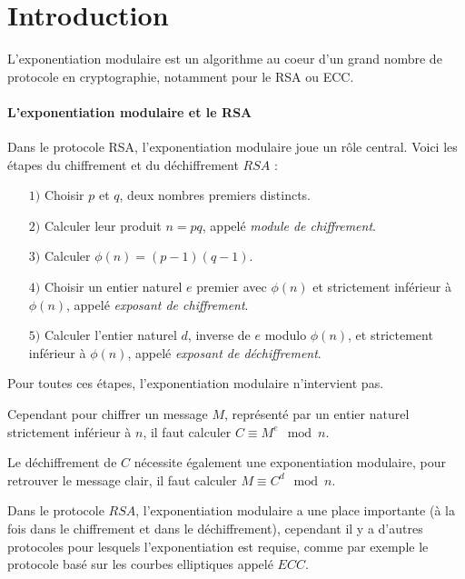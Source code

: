 \documentclass[12pt, a4paper]{memoir}
\begin{document}
\cleardoublepage
\tableofcontents* %
\normalsize

\mainmatter

\chapter{Introduction} 
L'exponentiation modulaire est un algorithme au coeur d'un grand nombre de protocole en cryptographie, notamment pour le RSA ou ECC.

\subsubsection{L'exponentiation modulaire et le RSA}

Dans le protocole RSA, l'exponentiation modulaire joue un rôle central. Voici les étapes du 
chiffrement et du déchiffrement $RSA$ :
\begin{itemize}
 \item [$1)$] Choisir $p$ et $q$, deux nombres premiers distincts.
 \item [$2)$] Calculer leur produit $n = pq$, appelé \emph{module de chiffrement}.
 \item [$3)$] Calculer $\phi(n) = (p-1)(q-1)$.
 \item [$4)$] Choisir un entier naturel $e$ premier avec $\phi(n)$ et strictement inférieur à $\phi(n)$,
 appelé \emph{exposant de chiffrement}.
 \item [$5)$] Calculer l'entier naturel $d$, inverse de $e$ modulo $\phi(n)$, et strictement inférieur à $\phi(n)$,
 appelé \emph{exposant de déchiffrement}.
\end{itemize}

Pour toutes ces étapes, l'exponentiation modulaire n'intervient pas.

Cependant pour chiffrer un message $M$, représenté par un entier naturel strictement inférieur à $n$, il faut 
calculer $C \equiv M^e \mod n$.

Le déchiffrement de $C$ nécessite également une exponentiation modulaire, pour retrouver le message clair,
il faut calculer $M \equiv C^d \mod n$.

Dans le protocole $RSA$, l'exponentiation modulaire a une place importante (à la fois dans le chiffrement et dans le déchiffrement),
cependant il y a d'autres protocoles pour lesquels l'exponentiation est requise, comme par exemple le protocole
basé sur les courbes elliptiques appelé $ECC$.
\end{document}
